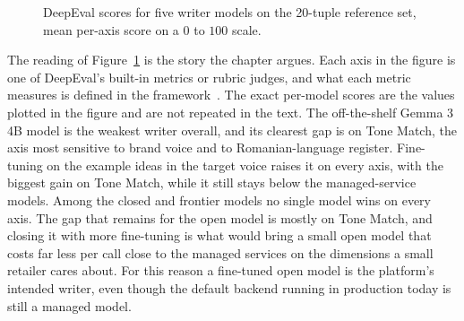 \begin{figure}[!ht]
\caption[DeepEval scores for five writer models on the 20-tuple reference set.]{DeepEval scores for five writer models on the 20-tuple reference set, mean per-axis score on a $0$ to $100$ scale.}
\label{fig:deepeval-models}
\end{figure}

The reading of Figure~\ref{fig:deepeval-models} is the story the chapter argues. Each axis in the figure is one of DeepEval's built-in metrics or rubric judges, and what each metric measures is defined in the framework~\cite{deepeval2024}. The exact per-model scores are the values plotted in the figure and are not repeated in the text. The off-the-shelf Gemma 3 4B model is the weakest writer overall, and its clearest gap is on Tone Match, the axis most sensitive to brand voice and to Romanian-language register. Fine-tuning on the example ideas in the target voice raises it on every axis, with the biggest gain on Tone Match, while it still stays below the managed-service models. Among the closed and frontier models no single model wins on every axis. The gap that remains for the open model is mostly on Tone Match, and closing it with more fine-tuning is what would bring a small open model that costs far less per call close to the managed services on the dimensions a small retailer cares about. For this reason a fine-tuned open model is the platform's intended writer, even though the default backend running in production today is still a managed model.

